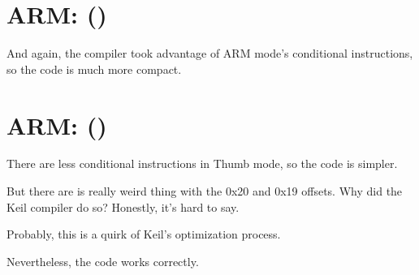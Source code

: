 ﻿\section{ARM: \OptimizingKeilVI (\ARMMode)}

And again, the compiler took advantage of ARM mode's conditional instructions, 
so the code is much more compact.



\section{ARM: \OptimizingKeilVI (\ThumbMode)}
\myindex{\CompilerAnomaly}
\label{Keil_anomaly}

There are less conditional instructions in Thumb mode, so the code is simpler.

But there are is really weird thing with the 0x20 and 0x19 offsets.
Why did the Keil compiler do so?
Honestly, it's hard to say.

Probably, this is a quirk of Keil's optimization process.

Nevertheless, the code works correctly.



